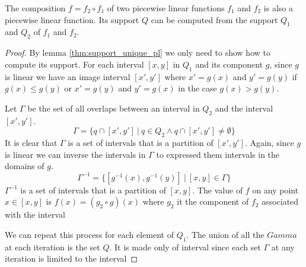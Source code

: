 \begin{lemma}
  The composition $f = f_2 \circ f_1 $ of two piecewise linear functions $f_1$ and $f_2$ is also a
  piecewise linear function. Its support $Q$ can be computed from the support
  $Q_1$ and $Q_2$ of $f_1$ and $f_2$.
\end{lemma}
\begin{proof}
  By lemma \ref{thm:support_unique_pl} we only need to show how to compute its
  support. For each interval $[x,y]$ in $Q_1$ and its component $g$, since $g$
  is linear we have an image interval $[x',y']$ where $x' = g(x)$ and $y' =
  g(y)$ if $g(x) \le g(y)$ or $x' = g(y)$ and $y' = g(x)$ in the case $g(x) >
  g(y)$.

  Let $\Gamma$ be the set of all overlaps between an interval in $Q_2$ and the
  interval $[x',y']$. 
  \begin{equation*}
    \Gamma = \{q \cap [x',y'] \ | \ q \in Q_2 \land q \cap [x',y'] \neq \emptyset \}
  \end{equation*}
  It is clear that $\Gamma$ is a set of intervals that is a partition of
  $[x',y']$. Again, since $g$ is linear we can inverse the intervals in $\Gamma$
  to expressed them intervals in the domains of $g$. 
  \begin{equation*}
    \Gamma^{-1} = \{[g^{-1}(x), g^{-1}(y)] \ | \ [x,y] \in \Gamma \}
  \end{equation*}
  $\Gamma^{-1}$ is a set of intervals that is a partition of $[x,y]$. The value
  of $f$ on any point $x \in [x,y]$ is $f(x) = (g_2 \circ g)(x)$ where $g_2$ it
  the component of $f_2$ associated with the interval 

  
  We can repeat this process for each element of $Q_1$. The union of all the
  $Gamma$ at each iteration is the set $Q$. It is made only of interval since
  each set $\Gamma$ at any iteration is limited to the interval

\end{proof}


